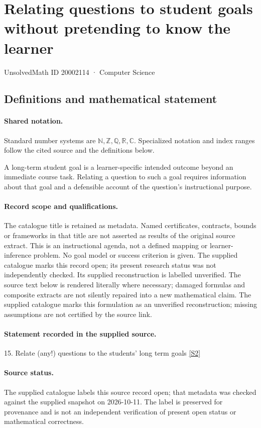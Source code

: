 \documentclass[11pt]{article}
\newcommand{\sref}[2]{\hyperlink{source:#1:#2}{[S#2]}}
\begin{document}
\setcounter{section}{20002113}
\section{Relating questions to student goals without pretending to know the learner}\label{20002114}
{\small\sffamily UnsolvedMath ID 20002114 · Computer Science}
\subsection{Definitions and mathematical statement}

\paragraph{Shared notation.}Standard number systems are $\mathbb N,\mathbb Z,\mathbb Q,\mathbb R,\mathbb C$. Specialized notation and index ranges follow the cited source and the definitions below.


A long-term student goal is a learner-specific intended outcome beyond an immediate course task. Relating a question to such a goal requires information about that goal and a defensible account of the question's instructional purpose.
\paragraph{Record scope and qualifications.}
The catalogue title is retained as metadata. Named certificates, contracts, bounds or frameworks in that title are not asserted as results of the original source extract.
This is an instructional agenda, not a defined mapping or learner-inference problem. No goal model or success criterion is given. The supplied catalogue marks this record open; its present research status was not independently checked. Its supplied reconstruction is labelled unverified.
The source text below is rendered literally where necessary; damaged formulas and composite extracts are not silently repaired into a new mathematical claim.
The supplied catalogue marks this formulation as an unverified reconstruction; missing assumptions are not certified by the source link.
\paragraph{Statement recorded in the supplied source.}
15. Relate (any!) questions to the students' long term goals \sref{20002114}{2}
\paragraph{Source status.}
The supplied catalogue labels this source record open; that metadata was checked against the supplied snapshot on 2026-10-11. The label is preserved for provenance and is not an independent verification of present open status or mathematical correctness.
\end{document}
